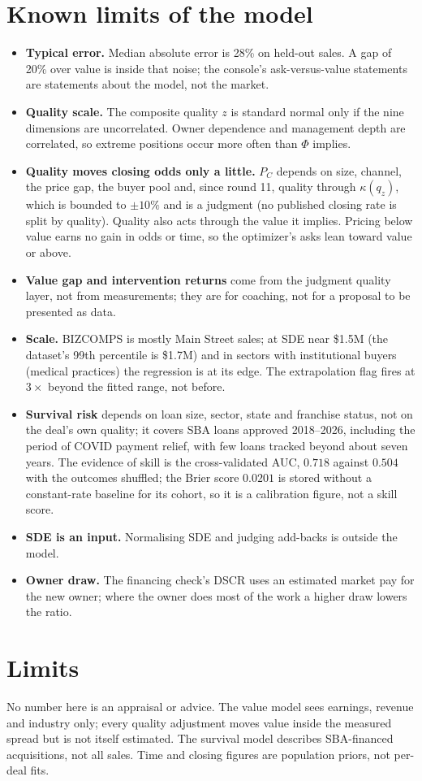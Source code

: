 \documentclass[11pt]{article}
\begin{document}
\section{Known limits of the model}
\begin{itemize}[nosep]
\item \textbf{Typical error.} Median absolute error is 28\% on held-out sales. A gap of 20\% over value is inside that noise; the console's ask-versus-value statements are statements about the model, not the market.
\item \textbf{Quality scale.} The composite quality $z$ is standard normal only if the nine dimensions are uncorrelated. Owner dependence and management depth are correlated, so extreme positions occur more often than $\Phi$ implies.
\item \textbf{Quality moves closing odds only a little.} $P_C$ depends on size, channel, the price gap, the buyer pool and, since round 11, quality through $\kappa(q_z)$, which is bounded to $\pm10\%$ and is a judgment (no published closing rate is split by quality). Quality also acts through the value it implies. Pricing below value earns no gain in odds or time, so the optimizer's asks lean toward value or above.
\item \textbf{Value gap and intervention returns} come from the judgment quality layer, not from measurements; they are for coaching, not for a proposal to be presented as data.
\item \textbf{Scale.} BIZCOMPS is mostly Main Street sales; at SDE near \$1.5M (the dataset's 99th percentile is \$1.7M) and in sectors with institutional buyers (medical practices) the regression is at its edge. The extrapolation flag fires at $3\times$ beyond the fitted range, not before.
\item \textbf{Survival risk} depends on loan size, sector, state and franchise status, not on the deal's own quality; it covers SBA loans approved 2018--2026, including the period of COVID payment relief, with few loans tracked beyond about seven years. The evidence of skill is the cross-validated AUC, $0.718$ against $0.504$ with the outcomes shuffled; the Brier score $0.0201$ is stored without a constant-rate baseline for its cohort, so it is a calibration figure, not a skill score.
\item \textbf{SDE is an input.} Normalising SDE and judging add-backs is outside the model.
\item \textbf{Owner draw.} The financing check's DSCR uses an estimated market pay for the new owner; where the owner does most of the work a higher draw lowers the ratio.
\end{itemize}

\section*{Limits}
No number here is an appraisal or advice. The value model sees earnings, revenue and industry only; every quality adjustment moves value inside the measured spread but is not itself estimated. The survival model describes SBA-financed acquisitions, not all sales. Time and closing figures are population priors, not per-deal fits.
\end{document}

